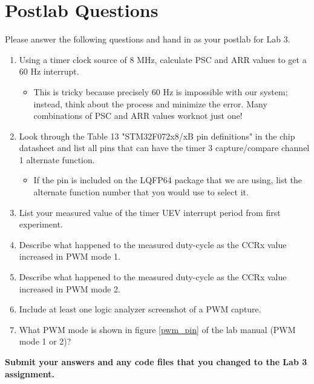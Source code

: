 \documentclass[openany,11pt,fleqn]{book} %
\begin{document}
\section{\color{blue}Postlab Questions}
\begin{question}[Postlab 3]
	Please answer the following questions and hand in as your postlab for Lab 3.
	\begin{enumerate}
		\item Using a timer clock source of 8 MHz, calculate PSC and ARR values to get a 60 Hz interrupt.
		\begin{itemize}
			\item This is tricky because precisely 60 Hz is impossible with our system; instead, think about the process and minimize the error. Many combinations of PSC and ARR values work\textemdash not just one!
		\end{itemize}
		\item Look through the Table 13 "STM32F072x8/xB pin definitions" in the chip datasheet and list all pins that can have the timer 3 capture/compare channel 1 alternate function.
		\begin{itemize}
			\item If the pin is included on the LQFP64 package that we are using, list the alternate function number that you would use to select it.
		\end{itemize}
		\item List your measured value of the timer UEV interrupt period from first experiment.
		\item Describe what happened to the measured duty-cycle as the CCRx value increased in PWM mode 1.
		\item Describe what happened to the measured duty-cycle as the CCRx value increased in PWM mode 2.
		\item Include at least one logic analyzer screenshot of a PWM capture. 
		\item What PWM mode is shown in figure \ref{pwm_pin} of the lab manual (PWM mode 1 or 2)?
	\end{enumerate}
	\textbf{Submit your answers and any code files that you changed to the Lab 3 assignment.}
\end{question}
\end{document}
